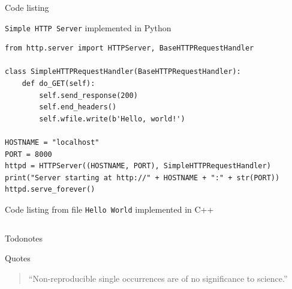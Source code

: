 \documentclass[compress,aspectratio=169]{beamer}
\begin{document}
\begin{frame}[fragile]{Code listing}
	
	\texttt{Simple HTTP Server} implemented in Python
	
	\begin{tcolorbox}[title=Python]
		\footnotesize\begin{verbatim}
from http.server import HTTPServer, BaseHTTPRequestHandler

class SimpleHTTPRequestHandler(BaseHTTPRequestHandler):
	def do_GET(self):
		self.send_response(200)
		self.end_headers()
		self.wfile.write(b'Hello, world!')

HOSTNAME = "localhost"
PORT = 8000
httpd = HTTPServer((HOSTNAME, PORT), SimpleHTTPRequestHandler)
print("Server starting at http://" + HOSTNAME + ":" + str(PORT))
httpd.serve_forever()
		\end{verbatim}
	\end{tcolorbox}
\end{frame}

\begin{frame}[fragile]{Code listing from file}
    \texttt{Hello World} implemented in C++

    \begin{tcolorbox}[title=C++]
        \footnotesize\inputminted[xleftmargin=1em,linenos]{c++}{assets/hello-world.cpp}
    \end{tcolorbox}

\end{frame}

\begin{frame}{Todonotes}
\end{frame}

\begin{frame}{Quotes}
    \vspace*{\fill}
    \begin{quote}
        \centering\Large
        \enquote{Non-reproducible single occurrences are of no significance to science.}
    \end{quote}
    \vspace{1cm}
    \hspace*{}
    \vspace*{\fill}

\end{frame}
\end{document}
